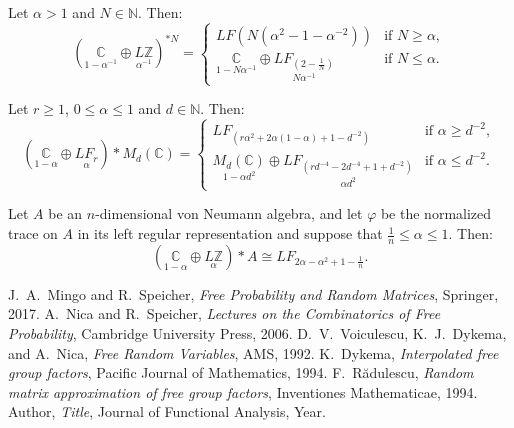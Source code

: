 \begin{corollary}\label{LF power formula}
Let $\alpha > 1$ and $N \in \mathbb{N}$. Then:
\[
\left( \underset{1-\alpha^{-1}}{\mathbb{C}} \oplus \underset{\alpha^{-1}}{L\mathbb{Z}}\right)^{*N} = 
\begin{cases}
LF(N(\alpha^2-1 - \alpha^{-2})) & \text{if } N \geq \alpha, \\
\underset{1-N\alpha^{-1}}{\mathbb{C}} \oplus \underset{N\alpha^{-1}}{LF_{\left( 2 - \frac{1}{N} \right)}} & \text{if } N \leq \alpha.
\end{cases}
\]
\end{corollary}

\begin{proposition}\label{LF formula matrix}
Let $r \geq 1$, $0 \leq \alpha \leq 1$ and $d \in \mathbb{N}$. Then:
\[
\left( \underset{1-\alpha}{\mathbb{C}} \oplus \underset{\alpha}{LF_r} \right) * M_d(\mathbb{C}) = 
\begin{cases}
LF_{(r\alpha^2 + 2\alpha(1-\alpha) + 1 - d^{-2})} & \text{if } \alpha \geq d^{-2}, \\
\underset{1-\alpha d^2}{M_d(\mathbb{C})} \oplus \underset{\alpha d^2}{LF_{(rd^{-4} - 2d^{-4} + 1 + d^{-2})}} & \text{if } \alpha \leq d^{-2}.
\end{cases}
\]
\end{proposition}

\begin{proposition}\label{special case}
Let $A$ be an $n$-dimensional von Neumann algebra, and let $\varphi$ be the normalized trace on $A$ in its left regular representation and suppose that $\frac{1}{n} \leq \alpha \leq 1$. Then:
\[
\left( \underset{1-\alpha}{\mathbb{C}} \oplus \underset{\alpha}{L\mathbb{Z}} \right) * A 
\cong LF_{2 \alpha - \alpha^2 +1 - \frac{1}{n}}.
\]
\end{proposition}

\begin{thebibliography}{9}
 J.~A.~Mingo and R.~Speicher, \emph{Free Probability and Random Matrices}, Springer, 2017.
 A.~Nica and R.~Speicher, \emph{Lectures on the Combinatorics of Free Probability}, Cambridge University Press, 2006.
 D.~V.~Voiculescu, K.~J.~Dykema, and A.~Nica, \emph{Free Random Variables}, AMS, 1992.
 K.~Dykema, \emph{Interpolated free group factors}, Pacific Journal of Mathematics, 1994.
 F.~R\u{a}dulescu, \emph{Random matrix approximation of free group factors}, Inventiones Mathematicae, 1994.
 Author, \emph{Title}, Journal of Functional Analysis, Year.
\end{thebibliography}


